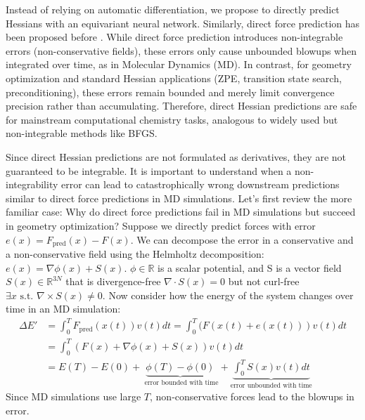 \documentclass[pdflatex,sn-mathphys-num]{sn-jnl}%
\theoremstyle{thmstyleone}%
\theoremstyle{thmstyletwo}%
\theoremstyle{thmstylethree}%
\begin{document}
\begin{appendices}
Instead of relying on automatic differentiation, we propose to directly predict Hessians with an equivariant neural network. Similarly, direct force prediction has been proposed before \citep{gasteiger2021, liao2023equiformerv2}. 
While direct force prediction introduces non-integrable errors (non-conservative fields), these errors only cause unbounded blowups when integrated over time, as in Molecular Dynamics (MD). In contrast, for geometry optimization and standard Hessian applications (ZPE, transition state search, preconditioning), these errors remain bounded and merely limit convergence precision rather than accumulating. Therefore, direct Hessian predictions are safe for mainstream computational chemistry tasks, analogous to widely used but non-integrable methods like BFGS.

Since direct Hessian predictions are not formulated as derivatives, they are not guaranteed to be integrable. It is important to understand when a non-integrability error can lead to catastrophically wrong downstream predictions similar to direct force predictions in MD simulations. 
Let's first review the more familiar case: Why do direct force predictions fail in MD simulations but succeed in geometry optimization? Suppose we directly predict forces with error $e(x)=F_\text{pred}(x) - F(x)$. We can decompose the error in a conservative and a non-conservative field using the Helmholtz decomposition: $e(x) = \nabla \phi(x) + S(x)$. $\phi\in \mathbb{R}$ is a scalar potential, and S is a vector field $S(x) \in \mathbb{R}^{3N}$ that is divergence-free $\nabla \cdot S(x) = 0$ but not curl-free $\exists x \text{ s.t. } \nabla \times S(x) \neq 0$.
Now consider how the energy of the system changes over time in an MD simulation:
$$
\begin{aligned}
\Delta E' &= \int_0^T F_\text{pred}(x(t)) v(t) dt = \int_0^T (F(x(t) + e(x(t))) v(t) dt \\
&= \int_0^T (F(x) + \nabla \phi(x) + S(x))v(t) dt \\ 
&= E(T) - E(0) + \underbrace{\phi(T) - \phi(0)}_{\text{ error bounded with time}} + \underbrace{\int_0^T S(x) v(t) dt}_{\text{error unbounded with time}}
\end{aligned}
$$
Since MD simulations use large $T$, non-conservative forces lead to the blowups in error. 


\end{appendices}
\end{document}
